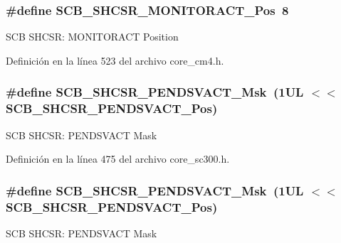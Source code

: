 \subsubsection[{\texorpdfstring{S\+C\+B\+\_\+\+S\+H\+C\+S\+R\+\_\+\+M\+O\+N\+I\+T\+O\+R\+A\+C\+T\+\_\+\+Pos}{SCB_SHCSR_MONITORACT_Pos}}]{\setlength{\rightskip}{0pt plus 5cm}\#define S\+C\+B\+\_\+\+S\+H\+C\+S\+R\+\_\+\+M\+O\+N\+I\+T\+O\+R\+A\+C\+T\+\_\+\+Pos~8}\hypertarget{group___c_m_s_i_s___s_c_b_ga8b71cf4c61803752a41c96deb00d26af}{}\label{group___c_m_s_i_s___s_c_b_ga8b71cf4c61803752a41c96deb00d26af}
S\+CB S\+H\+C\+SR\+: M\+O\+N\+I\+T\+O\+R\+A\+CT Position 

Definición en la línea 523 del archivo core\+\_\+cm4.\+h.

\subsubsection[{\texorpdfstring{S\+C\+B\+\_\+\+S\+H\+C\+S\+R\+\_\+\+P\+E\+N\+D\+S\+V\+A\+C\+T\+\_\+\+Msk}{SCB_SHCSR_PENDSVACT_Msk}}]{\setlength{\rightskip}{0pt plus 5cm}\#define S\+C\+B\+\_\+\+S\+H\+C\+S\+R\+\_\+\+P\+E\+N\+D\+S\+V\+A\+C\+T\+\_\+\+Msk~(1\+U\+L $<$$<$ S\+C\+B\+\_\+\+S\+H\+C\+S\+R\+\_\+\+P\+E\+N\+D\+S\+V\+A\+C\+T\+\_\+\+Pos)}\hypertarget{group___c_m_s_i_s___s_c_b_gae0e837241a515d4cbadaaae1faa8e039}{}\label{group___c_m_s_i_s___s_c_b_gae0e837241a515d4cbadaaae1faa8e039}
S\+CB S\+H\+C\+SR\+: P\+E\+N\+D\+S\+V\+A\+CT Mask 

Definición en la línea 475 del archivo core\+\_\+sc300.\+h.

\subsubsection[{\texorpdfstring{S\+C\+B\+\_\+\+S\+H\+C\+S\+R\+\_\+\+P\+E\+N\+D\+S\+V\+A\+C\+T\+\_\+\+Msk}{SCB_SHCSR_PENDSVACT_Msk}}]{\setlength{\rightskip}{0pt plus 5cm}\#define S\+C\+B\+\_\+\+S\+H\+C\+S\+R\+\_\+\+P\+E\+N\+D\+S\+V\+A\+C\+T\+\_\+\+Msk~(1\+U\+L $<$$<$ S\+C\+B\+\_\+\+S\+H\+C\+S\+R\+\_\+\+P\+E\+N\+D\+S\+V\+A\+C\+T\+\_\+\+Pos)}\hypertarget{group___c_m_s_i_s___s_c_b_gae0e837241a515d4cbadaaae1faa8e039}{}\label{group___c_m_s_i_s___s_c_b_gae0e837241a515d4cbadaaae1faa8e039}
S\+CB S\+H\+C\+SR\+: P\+E\+N\+D\+S\+V\+A\+CT Mask 

